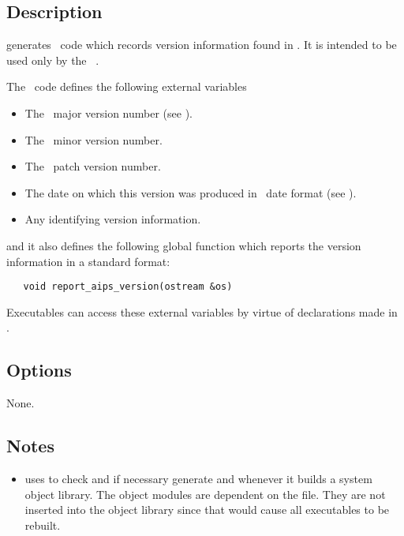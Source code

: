 \subsection*{Description}
 
 generates \cplusplus\ code which records version information
found in .  It is intended to be used only by the
\aipspp\ .

The \cplusplus\ code defines the following external variables

\begin{itemize}
\item
    The \aipspp\ major version number
   (see ).

\item
    The \aipspp\ minor version number.

\item
    The \aipspp\ patch version number.

\item
    The date on which this version was
   produced in \aipspp\ date format (see ).

\item
    Any identifying version
   information.
\end{itemize}
 
\noindent
and it also defines the following global function which reports the version
information in a standard format:

\begin{verbatim}
   void report_aips_version(ostream &os)
\end{verbatim}

\noindent
Executables can access these external variables by virtue of declarations
made in .

\subsection*{Options}
 
None.
 
\subsection*{Notes}
 
\begin{itemize}
\item
    uses  to check and if necessary generate
    and  whenever it
   builds a system object library.  The  object modules are
   dependent on the  file.  They are not inserted
   into the object library since that would cause all executables to be
   rebuilt.
\end{itemize}
 
